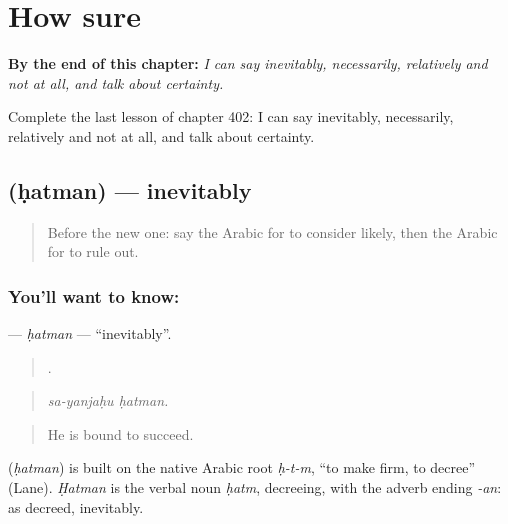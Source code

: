 
\chapter{How sure}
\label{ch:ar-how-sure}

\begin{chapteropening}
\textbf{By the end of this chapter:} \emph{I can say inevitably, necessarily, relatively and not at all, and talk about certainty.}

Complete the last lesson of chapter 402: I can say inevitably, necessarily, relatively and not at all, and talk about certainty.
\end{chapteropening}

\section[\texorpdfstring{\ar{حتما} (ḥatman)}{حتما (ḥatman)}]{ (ḥatman) — inevitably}

\label{lesson:AR-C402-hatman}



\begin{quote}
Before the new one: say the Arabic for to consider likely, then the Arabic for to rule out.
\end{quote}

\subsection*{You'll want to know: }
\textbf{} — \emph{ḥatman} — \textquotedblleft{}inevitably\textquotedblright{}.

\begin{quote}
 .
\end{quote}

\begin{quote}
\emph{sa-yanjaḥu ḥatman.}
\end{quote}

\begin{quote}
He is bound to succeed.
\end{quote}

\begin{cousinweb}
\textbf{} (\emph{ḥatman}) is built on the native Arabic root \emph{ḥ-t-m}, \textquotedblleft{}to make firm, to decree\textquotedblright{} (Lane). \emph{Ḥatman} is the verbal noun \emph{ḥatm}, decreeing, with the adverb ending \emph{-an}: as decreed, inevitably.
\end{cousinweb}

